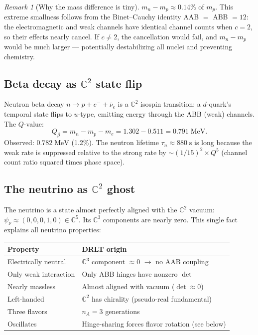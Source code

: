 \documentclass[12pt]{article}
\theoremstyle{remark}
\newtheorem{remark}[theorem]{Remark}
\theoremstyle{definition}
\newcommand{\CC}{\mathbb{C}}
\begin{document}
\begin{remark}[Why the mass difference is tiny]
$m_n - m_p \approx 0.14\%$ of $m_p$. This extreme smallness follows from the Binet--Cauchy identity AAB $=$ ABB $= 12$: the electromagnetic and weak channels have identical channel counts when $c = 2$, so their effects nearly cancel. If $c \neq 2$, the cancellation would fail, and $m_n - m_p$ would be much larger --- potentially destabilizing all nuclei and preventing chemistry.
\end{remark}

\subsection{Beta decay as $\CC^2$ state flip}

Neutron beta decay $n \to p + e^- + \bar{\nu}_e$ is a $\CC^2$ isospin transition: a $d$-quark's temporal state flips to $u$-type, emitting energy through the ABB (weak) channels. The $Q$-value:
\begin{equation}
Q_\beta = m_n - m_p - m_e = 1.302 - 0.511 = 0.791\;\text{MeV}.
\end{equation}
Observed: $0.782\;\text{MeV}$ (1.2\%). The neutron lifetime $\tau_n \approx 880\;\text{s}$ is long because the weak rate is suppressed relative to the strong rate by $\sim(1/15)^2 \times Q^5$ (channel count ratio squared times phase space).

\subsection{The neutrino as $\CC^2$ ghost}

The neutrino is a state almost perfectly aligned with the $\CC^2$ vacuum: $\psi_\nu \approx (0, 0, 0, 1, 0) \in \CC^5$. Its $\CC^3$ components are nearly zero. This single fact explains all neutrino properties:

\begin{center}
\begin{tabular}{ll}
\hline
Property & DRLT origin \\
\hline
Electrically neutral & $\CC^3$ component $\approx 0$ $\to$ no AAB coupling \\
Only weak interaction & Only ABB hinges have nonzero $\det$ \\
Nearly massless & Almost aligned with vacuum ($\det \approx 0$) \\
Left-handed & $\CC^2$ has chirality (pseudo-real fundamental) \\
Three flavors & $n_A = 3$ generations \\
Oscillates & Hinge-sharing forces flavor rotation (see below) \\
\hline
\end{tabular}
\end{center}
\end{document}
